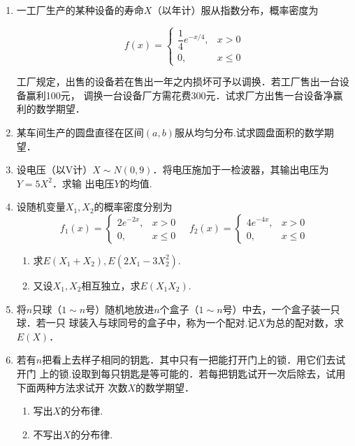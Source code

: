 \documentclass[10pt,a4paper]{article}
\begin{document}
\begin{enumerate}
    \item 一工厂生产的某种设备的寿命$X$（以年计）服从指数分布，概率密度为
    \vspace{-0.5cm}
    \begin{spacing}{2.0}
    $$f(x)=\left\{\begin{array}{ll} 
        \dfrac{1}{4}e^{-x/4}, & x>0\\
        0, & x\leq 0
    \end{array}\right.$$
    \end{spacing}
    \vspace{-0.5cm}
    工厂规定，出售的设备若在售出一年之内损坏可予以调换．若工厂售出一台设备赢利100元，
    调换一台设备厂方需花费300元．试求厂方出售一台设备净赢利的数学期望．
    

    \item 某车间生产的圆盘直径在区间$(a,b)$服从均匀分布.试求圆盘面积的数学期望．
    


    \item 设电压（以V计）$X\sim N(0,9)$．将电压施加于一检波器，其输出电压为$Y=5X^2$．求输
    出电压$Y$的均值.


    \item 设随机变量$X_1,X_2$的概率密度分别为
    $$f_1(x)=\left\{\begin{array}{ll}
        2e^{-2x}, & x>0\\
        0, & x\leq 0
    \end{array}\right.\quad
    f_2(x)=\left\{\begin{array}{ll}
        4e^{-4x}, & x>0\\
        0, & x\leq 0
    \end{array}\right.$$
    \begin{enumerate}
        \item 求$E(X_1+X_2),E(2X_1-3X_2^2)$.
        \item 又设$X_1,X_2$相互独立，求$E(X_1X_2)$.
    \end{enumerate}


    \item 将$n$只球（$1\sim n$号）随机地放进$n$个盒子（$1\sim n$号）中去，一个盒子装一只球．若一只
    球装入与球同号的盒子中，称为一个配对.记$X$为总的配对数，求$E(X)$．


    \item 若有$n$把看上去样子相同的钥匙．其中只有一把能打开门上的锁．用它们去试开门
    上的锁.设取到每只钥匙是等可能的．若每把钥匙试开一次后除去，试用下面两种方法求试开
    次数$X$的数学期望．
    \begin{enumerate}
        \item 写出$X$的分布律.
        \item 不写出$X$的分布律.
    \end{enumerate}
    



\end{enumerate}
\end{document}
